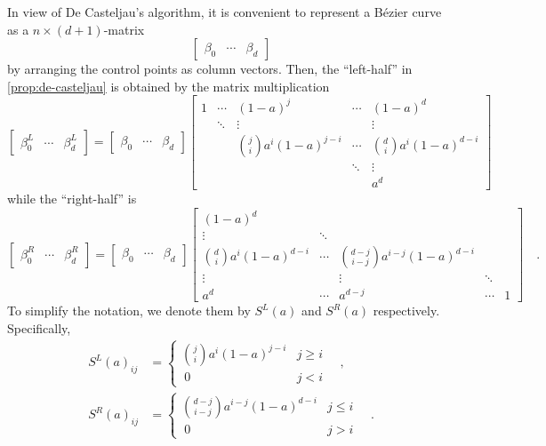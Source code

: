 \documentclass[pdftex,a4paper,12pt]{scrartcl}
\theoremstyle{plain}
\theoremstyle{definition}
\theoremstyle{remark}
\numberwithin{equation}{section}
\begin{document}
In view of De Casteljau's algorithm, it is convenient to represent a B\'ezier curve as a $n\times (d+1)$-matrix
\[
\begin{bmatrix}\beta_0 & \cdots & \beta_d\end{bmatrix}
\]
by arranging the control points as column vectors.
Then, the ``left-half'' in \cref{prop:de-casteljau} is obtained by the matrix multiplication
\[
\begin{bmatrix}\beta^L_0 & \cdots & \beta^L_d\end{bmatrix}
= \begin{bmatrix}\beta_0 & \cdots & \beta_d\end{bmatrix}
\begin{bmatrix}
1 & \cdots & (1-a)^j & \cdots & (1-a)^d \\
& \ddots & \vdots && \vdots\\
&& \binom{j}{i}a^i(1-a)^{j-i} & \cdots & \binom{d}{i}a^i(1-a)^{d-i} \\
&&& \ddots & \vdots \\
&&&& a^d
\end{bmatrix}
\]
while the ``right-half'' is
\[
\begin{bmatrix}\beta^R_0 & \cdots & \beta^R_d\end{bmatrix}
= \begin{bmatrix}\beta_0 & \cdots & \beta_d\end{bmatrix}
\begin{bmatrix}
(1-a)^d &&&& \\
\vdots & \ddots &&& \\
\binom{d}{i}a^i(1-a)^{d-i} & \cdots & \binom{d-j}{i-j}a^{i-j}(1-a)^{d-i} && \\
\vdots && \vdots & \ddots & \\
a^d & \cdots & a^{d-j} & \cdots & 1
\end{bmatrix}
\quad.
\]
To simplify the notation, we denote them by $S^L(a)$ and $S^R(a)$ respectively.
Specifically,
\[
\begin{split}
S^L(a)_{ij} &=
\begin{cases}
\displaystyle\binom{j}{i}a^i(1-a)^{j-i} & j\ge i\\
\ 0 & j < i
\end{cases}
\quad,
\\
S^R(a)_{ij} &=
\begin{cases}
\displaystyle\binom{d-j}{i-j}a^{i-j}(1-a)^{d-i} & j \le i\\
\ 0 & j > i
\end{cases}
\quad.
\end{split}
\]
\end{document}
